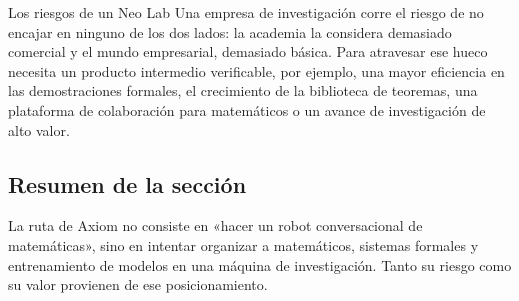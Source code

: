 \begin{warningbox}{Los riesgos de un Neo Lab}
Una empresa de investigación corre el riesgo de no encajar en ninguno de los dos lados: la academia la considera demasiado comercial y el mundo empresarial, demasiado básica. Para atravesar ese hueco necesita un producto intermedio verificable, por ejemplo, una mayor eficiencia en las demostraciones formales, el crecimiento de la biblioteca de teoremas, una plataforma de colaboración para matemáticos o un avance de investigación de alto valor.
\end{warningbox}

\subsection{Resumen de la sección}

La ruta de Axiom no consiste en «hacer un robot conversacional de matemáticas», sino en intentar organizar a matemáticos, sistemas formales y entrenamiento de modelos en una máquina de investigación. Tanto su riesgo como su valor provienen de ese posicionamiento.
